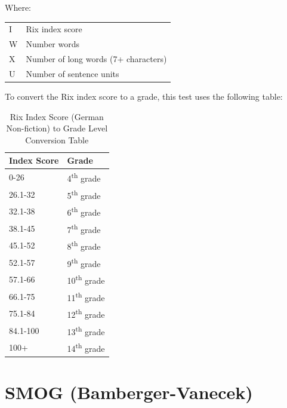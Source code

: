 \documentclass[
]{book}
\theoremstyle{definition}
\theoremstyle{definition}
\theoremstyle{definition}
\theoremstyle{definition}
\theoremstyle{remark}
\begin{document}
Where:

\begin{longtable}[]{@{}
  >{\raggedright\arraybackslash}p{}
  >{\raggedright\arraybackslash}p{}@{}}
\toprule
\endhead
I & Rix index score \\
W & Number words \\
X & Number of long words (7+ characters) \\
U & Number of sentence units \\
\bottomrule
\end{longtable}

\begin{minipage}{\textwidth}

To convert the Rix index score to a grade, this test uses the following table:

\begin{table}

\caption{\label{tab:unnamed-chunk-51}Rix Index Score (German Non-fiction) to Grade Level Conversion Table}
\centering
\begin{tabular}[t]{ll}
\toprule
Index Score & Grade\\
\midrule
0-26 & 4\textsuperscript{th} grade\\
26.1-32 & 5\textsuperscript{th} grade\\
32.1-38 & 6\textsuperscript{th} grade\\
38.1-45 & 7\textsuperscript{th} grade\\
45.1-52 & 8\textsuperscript{th} grade\\
52.1-57 & 9\textsuperscript{th} grade\\
57.1-66 & 10\textsuperscript{th} grade\\
66.1-75 & 11\textsuperscript{th} grade\\
75.1-84 & 12\textsuperscript{th} grade\\
84.1-100 & 13\textsuperscript{th} grade\\
100+ & 14\textsuperscript{th} grade\\
\bottomrule
\end{tabular}
\end{table}

\end{minipage}

\newpage

\hypertarget{smog-bamberger-vanecek}{%
\section{\texorpdfstring{SMOG (Bamberger-Vanecek)}{SMOG (Bamberger-Vanecek)}}\label{smog-bamberger-vanecek}}
\end{document}
